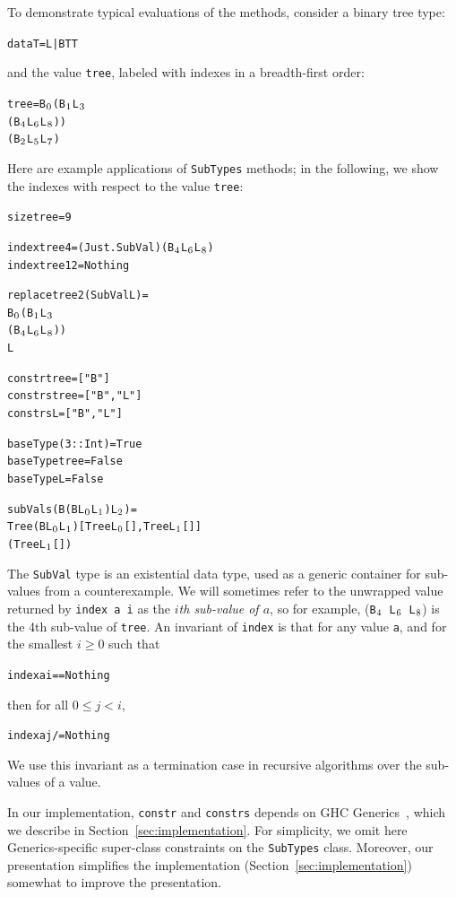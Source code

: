 \documentclass{sigplanconf}
\newenvironment{code}{\begin{alltt}}{\end{alltt}}
\newcommand{\ttp}[1]{\texttt{#1}}
\newcommand{\sub}[1]{\(\sb{#1}\)}
\begin{document}
\noindent
To demonstrate typical evaluations of the methods, consider a binary tree type:
%
\begin{code}
data T = L | B T T
\end{code}
%
\noindent
and the value \ttp{tree}, labeled with indexes in a breadth-first order:
%
\begin{code}
tree = B\sub{0} (B\sub{1} L\sub{3}
             (B\sub{4} L\sub{6} L\sub{8}))
          (B\sub{2} L\sub{5} L\sub{7})
\end{code}
%
\noindent
Here are example applications of \ttp{SubTypes} methods; in the following, we
show the indexes with respect to the value \ttp{tree}:
%
\begin{code}
size tree = 9

index tree 4  = (Just . SubVal) (B\sub{4} L\sub{6} L\sub{8})
index tree 12 = Nothing

replace tree 2 (SubVal L) =
  B\sub{0} (B\sub{1} L\sub{3}
        (B\sub{4} L\sub{6} L\sub{8}))
     L

constr  tree = ["B"]
constrs tree = ["B", "L"]
constrs L    = ["B", "L"]

baseType (3 :: Int) = True
baseType tree       = False
baseType L          = False

subVals (B (B L\sub{0} L\sub{1}) L\sub{2}) =
  Tree (B L\sub{0} L\sub{1}) [Tree L\sub{0} [], Tree L\sub{1} []]
       (Tree L\sub{1} [])
\end{code}
%
\noindent
The \ttp{SubVal} type is an existential data type, used as a generic container
for sub-values from a counterexample.  We will sometimes refer to the unwrapped
value returned by \ttp{index a i} as the \emph{$i$th sub-value of $a$}, so for
example, (\ttp{B\sub{4} L\sub{6} L\sub{8}}) is the 4th sub-value of \ttp{tree}.
An invariant of \ttp{index} is that for any value \ttp{a}, and for the smallest
$i \geq 0$ such that
%
\begin{code}
index a i == Nothing
\end{code}
%
\noindent
then for all $0 \leq j < i$,
%
\begin{code}
index a j /= Nothing
\end{code}
\noindent
We use this invariant as a termination case in recursive algorithms over the
sub-values of a value.

In our implementation, \ttp{constr} and \ttp{constrs} depends on GHC
Generics~\cite{generics}, which we describe in Section~\ref{sec:implementation}.
For simplicity, we omit here Generics-specific super-class constraints on the
\ttp{SubTypes} class.  Moreover, our presentation simplifies the implementation
(Section~\ref{sec:implementation}) somewhat to improve the presentation.
\end{document}
